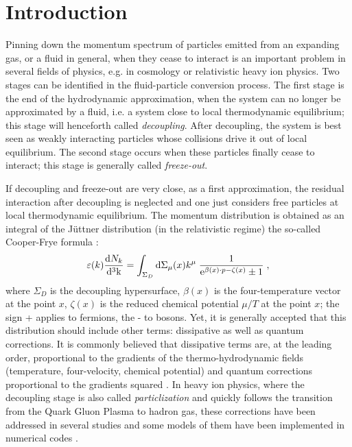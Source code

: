 \documentclass[prd,superscriptaddress,nofootinbib,notitlepage]{revtex4-1}
\newcommand{\e}{{\rm e}}
\newcommand{\kk}{{\rm k}}
\newcommand{\di}{{\rm d}}
\begin{document}
\maketitle


\section*{Introduction}

Pinning down the momentum spectrum of particles emitted from an expanding gas, or a fluid in general, when they 
cease to interact is an important problem in several fields of physics, e.g. in cosmology or relativistic heavy
ion physics. Two stages can be identified in the fluid-particle conversion process. The first stage is the end of the 
hydrodynamic approximation, when the system can no longer be approximated by a fluid, i.e. a system close to local 
thermodynamic equilibrium; this stage will henceforth called {\em decoupling}. After decoupling, the system is
best seen as weakly interacting particles whose collisions drive it out of local equilibrium. The second stage 
occurs when these particles finally cease to interact; this stage is generally called {\em freeze-out}. 

If decoupling and freeze-out are very close, as a first approximation, the residual interaction after decoupling is 
neglected and one just considers free particles at local thermodynamic equilibrium. The momentum distribution is obtained 
as an integral of the J\"uttner distribution (in the relativistic regime) the so-called Cooper-Frye formula \cite{Cooper:1974mv}:
%
\begin{equation}\label{cfrye}
    \varepsilon(k)\frac{\di N_k}{\di^3 \kk} = \int_{\Sigma_D}\di\Sigma_\mu(x) k^\mu \; 
    \frac{1}{\e^{\beta(x) \cdot p -\zeta(x)}\pm1} \;,
\end{equation}	
%
where $\Sigma_D$ is the decoupling hypersurface, $\beta(x)$ is the four-temperature vector at the point $x$, $\zeta(x)$
is the reduced chemical potential $\mu/T$ at the point $x$; the sign + applies to fermions, the - to bosons. Yet, it is 
generally accepted that this distribution should include other terms: dissipative as well as quantum corrections. It is 
commonly believed that dissipative terms are, at the leading order, proportional to the gradients of the thermo-hydrodynamic 
fields (temperature, four-velocity, chemical potential) and quantum corrections proportional to the gradients squared \cite{Kovtun:2012rj,Denicol:2012cn,Jaiswal:2014isa}. In heavy ion physics, where the decoupling stage is also called 
{\em particlization} and quickly follows the transition from the Quark Gluon Plasma to hadron gas, these corrections have 
been addressed in several studies \cite{Teaney:2003kp,Dusling:2007gi,Denicol:2009am,Pratt:2010jt,Luzum:2010ad,Teaney:2013gca,McNelis:2021acu} and some models of them have been implemented in numerical codes \cite{ShenEtAl2014,McNelis:2019auj}. 
\end{document}
